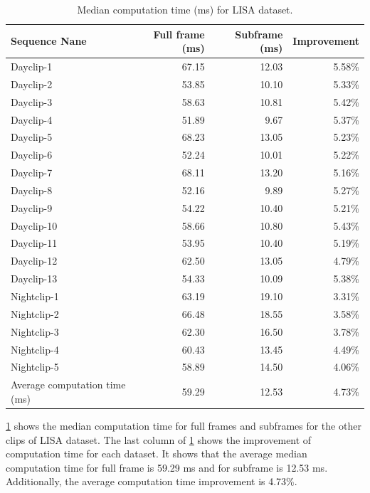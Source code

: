 \begin{table}[!ht]
  \centering
  \caption{Median computation time (ms) for LISA dataset.}
  \label{t:lisa_time}
  \begin{tabular}{  l   r   r  r}
    \rowcolor{gray!50}
    Sequence Nane &  Full frame (ms)  &  Subframe (ms) & Improvement \\
    \hline
    Dayclip-1 & 67.15 & 12.03 & 5.58\% \\
    Dayclip-2 & 53.85 & 10.10 & 5.33\% \\
    Dayclip-3 & 58.63 & 10.81 & 5.42\% \\
    Dayclip-4 & 51.89 & 9.67 & 5.37\% \\
    Dayclip-5 & 68.23 & 13.05 & 5.23\% \\
    Dayclip-6 & 52.24 & 10.01 & 5.22\% \\
    Dayclip-7 & 68.11  & 13.20 & 5.16\% \\
    Dayclip-8 & 52.16  & 9.89  & 5.27\% \\
    Dayclip-9 & 54.22  & 10.40  & 5.21\% \\
    Dayclip-10 & 58.66 & 10.80 & 5.43\% \\
    Dayclip-11 & 53.95 & 10.40 & 5.19\% \\
    Dayclip-12 & 62.50  & 13.05 & 4.79\% \\
    Dayclip-13 & 54.33 & 10.09 & 5.38\% \\
    Nightclip-1 & 63.19 & 19.10 & 3.31\% \\
    Nightclip-2 & 66.48 & 18.55 & 3.58\% \\
    Nightclip-3 & 62.30 & 16.50 & 3.78\% \\
    Nightclip-4 & 60.43 & 13.45 & 4.49\% \\
    Nightclip-5 & 58.89 & 14.50 & 4.06\% \\
    \hline
    Average computation time (ms) & 59.29 & 12.53 & 4.73\% \\
    
  \end{tabular}
\end{table}

\ref{t:lisa_time} shows the median computation time for full frames and subframes for the other clips of LISA dataset.
The last column of \ref{t:lisa_time} shows the improvement of computation time for each dataset.
It shows that the average median computation time for full frame is 59.29 ms and for subframe is 12.53 ms.
Additionally, the average computation time improvement is 4.73\%.


